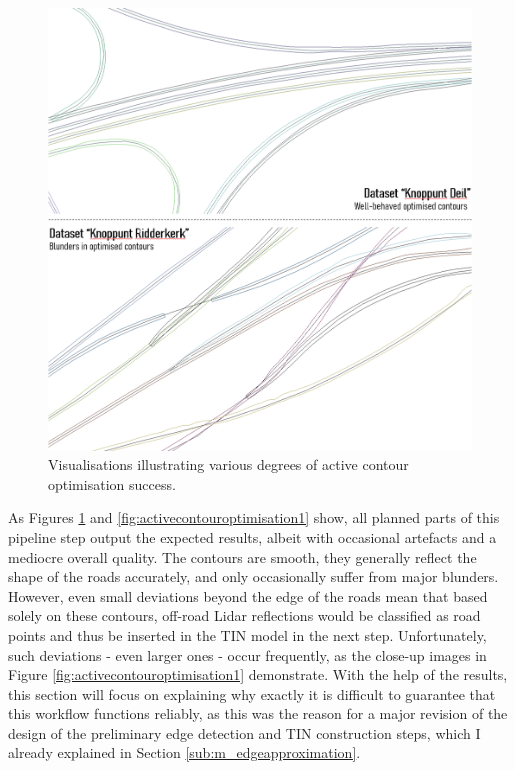 \begin{figure}
    \centering
    \includegraphics[width=0.9\linewidth]{final_report/figs/activecontouroptimisation0.png}
    \caption{Visualisations illustrating various degrees of active contour optimisation success.}
    \label{fig:activecontouroptimisation0}
\end{figure}

As Figures \ref{fig:activecontouroptimisation0} and \ref{fig:activecontouroptimisation1} show, all planned parts of this pipeline step output the expected results, albeit with occasional artefacts and a mediocre overall quality. The contours are smooth, they generally reflect the shape of the roads accurately, and only occasionally suffer from major blunders. However, even small deviations beyond the edge of the roads mean that based solely on these contours, off-road Lidar reflections would be classified as road points and thus be inserted in the TIN model in the next step. Unfortunately, such deviations - even larger ones - occur frequently, as the close-up images in Figure \ref{fig:activecontouroptimisation1} demonstrate. With the help of the results, this section will focus on explaining why exactly it is difficult to guarantee that this workflow functions reliably, as this was the reason for a major revision of the design of the preliminary edge detection and TIN construction steps, which I already explained in Section \ref{sub:m_edgeapproximation}.

